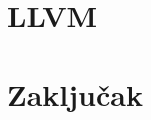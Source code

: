 \documentclass[a4paper]{article}
\begin{document}



\section{LLVM}
\label{sec:llvm}


\section{Zaključak}
\label{sec:zakljucak}

\appendix
 

\end{document}
